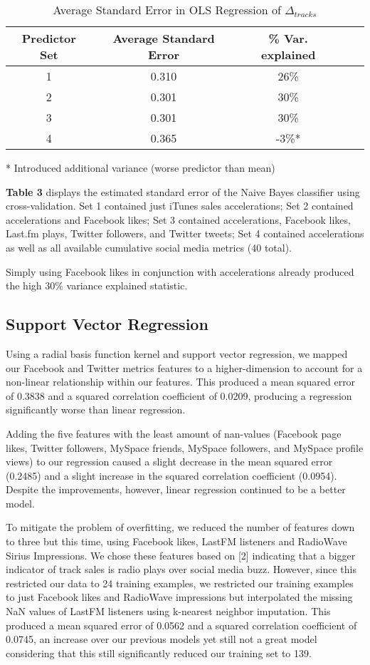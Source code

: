 \documentclass[conference]{IEEEtran}
\begin{document}
{\begin{table}[!t]
\renewcommand{\arraystretch}{1.1}
\caption{Average Standard Error in OLS Regression of $\Delta_{tracks}$}
\label{std_error_lin_reg}
\centering
\begin{tabular}{|c|c|c|c|c|}
\hline
Predictor Set & Average Standard Error & \% Var. explained\\
\hline
1 & 0.310 & 26\%\\
\hline
2 & 0.301 & 30\%\\
\hline
3 & 0.301 & 30\%\\
\hline
4 & 0.365 & -3\%*
\end{tabular}
* Introduced additional variance (worse predictor than mean)
\end{table}

\textbf{Table 3} displays the estimated standard error of the Naive Bayes classifier using cross-validation. Set 1 contained just iTunes sales accelerations; Set 2 contained accelerations and Facebook likes; Set 3 contained accelerations, Facebook likes, Last.fm plays, Twitter followers, and Twitter tweets; Set 4 contained accelerations as well as all available cumulative social media metrics (40 total).

Simply using Facebook likes in conjunction with accelerations already produced the high 30\% variance explained statistic. 

\subsection{Support Vector Regression}
Using a radial basis function kernel and support vector regression, we mapped our Facebook and Twitter metrics features to a higher-dimension to account for a non-linear relationship within our features. This produced a mean squared error of 0.3838 and a squared correlation coefficient of 0.0209, producing a regression significantly worse than linear regression.

Adding the five features with the least amount of nan-values (Facebook page likes, Twitter followers, MySpace friends, MySpace followers, and MySpace profile views) to our regression caused a slight decrease in the mean squared error (0.2485) and a slight increase in the squared correlation coefficient (0.0954). Despite the improvements, however, linear regression continued to be a better model.

To mitigate the problem of overfitting, we reduced the number of features down to three but this time, using Facebook likes, LastFM listeners and RadioWave Sirius Impressions. We chose these features based on [2] indicating that a bigger indicator of track sales is radio plays over social media buzz. However, since this restricted our data to 24 training examples, we restricted our training examples to just Facebook likes and RadioWave impressions but interpolated the missing NaN values of LastFM listeners using k-nearest neighbor imputation. This produced a mean squared error of 0.0562 and a squared correlation coefficient of 0.0745, an increase over our previous models yet still not a great model considering that this still significantly reduced our training set to 139.

}
\end{document}
